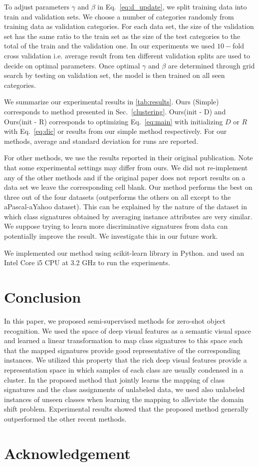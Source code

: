 \documentclass[10pt,twocolumn,letterpaper]{article}
\begin{document}
To adjust parameters $\gamma$ and $\beta$ in Eq.~\ref{eq:d_update}, we split training data into train and validation sets.
We choose a number of categories randomly from training data as validation categories. For each data set, the size of the
validation set has the same ratio to the train set as the size of the test categories to the total of the train and the validation one.
In our experiments we used $10-$fold cross validation i.e. average result from ten different validation splits are used to decide on
optimal parameters.
Once optimal $\gamma$ and $\beta$ are determined through grid search by testing on validation set, the model
is then trained on all seen categories.

We summarize our experimental results in \ref{tab:results}.
Ours (Simple) corresponds to method presented in Sec.~\ref{clustering}.
Ours(init - D) and Ours(init - R) corresponds to optimizing Eq.~\eqref{eq:main}
with initializing $D$ or $R$ with Eq.~\eqref{eq:dic} or results from our simple method respectively.
For our methods, average and standard deviation for runs are reported.

 For other methods, we use the results reported in their original publication. Note that some experimental settings may differ from ours. We did not re-implement any of the other methods and if the original paper does not report results on a data set we leave the corresponding cell blank.
Our method performs the best on three out of the four datasets (outperforms the others on all except to the aPascal-aYahoo dataset). This can be explained by the nature of the dataset in which class signatures obtained by averaging instance attributes are very similar. We suppose trying to learn
more discriminative signatures from data can potentially improve the result. We investigate this in our future work.

We implemented our method using scikit-learn library \cite{scikit-learn} in Python.
 and used an Intel Core i5 CPU at 3.2 GHz to run the experiments.

\section{Conclusion} \label{conclusion}
In this paper, we proposed semi-supervised methods for zero-shot object recognition. We used the space of deep visual features as a semantic visual space and learned a linear transformation to map class signatures to this space such that the mapped signatures provide good representative of the corresponding instances. We utilized this property that the rich deep visual features provide a representation space in which samples of each class are usually condensed in a cluster. In the proposed method that jointly learns the mapping of class signatures and the class assignments of unlabeled data, we used also unlabeled instances of unseen classes when learning the mapping to alleviate the domain shift problem. Experimental results showed that the proposed method generally outperformed the other recent methods.
\section*{Acknowledgement}
{\small


}
\end{document}
